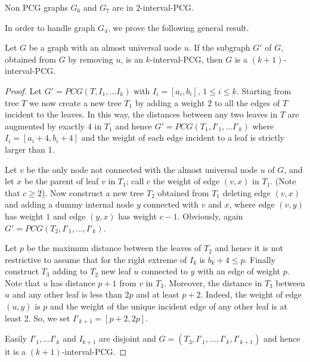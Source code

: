 \documentclass{fundam}
\newcommand{\Int}[1]{$#1$\textnormal{-interval-PCG}}
\begin{document}
\begin{corollary}
Non PCG graphs $G_6$ and $G_7$ are in \Int{2}.
\end{corollary}

In order to handle graph $G_4$, we prove the following general result.

\begin{theorem}
\label{theo:almost}
Let $G$ be a graph with an almost universal node $u$. If the subgraph $G'$ of $G$, obtained from $G$ by removing $u$, is  an \Int{k}, then $G$ is a \Int{(k+1)}.
\end{theorem}
\begin{proof}
Let $G'=PCG(T,I_1,\ldots I_k)$ with $I_i=[a_i, b_i]$, $1\leq i\leq k$.
Starting from tree $T$ we now create a new tree $T_1$ by adding a weight $2$
 to all the edges of $T$ incident to the leaves.
In this way, the distances between any two leaves in $T$ are augmented by exactly $4$ in $T_1$ and hence
$G'=PCG(T_1, I'_1,\ldots I'_k)$ where $I_i=[a_i+4,b_i+4]$ and the weight of each edge incident to a leaf is strictly larger than 1.

Let $v$ be the only node not connected with
the almost universal node $u$ of $G$, and let $x$ be the parent of leaf $v$ in $T_1$; call  $c$ the weight of edge $(v,x)$ in $T_1$. (Note that $c \geq 2$).
Now construct a new tree $T_2$ obtained from $T_1$ deleting edge $(v,x)$ and adding a  dummy internal node $y$ connected with $v$ and $x$, where edge $(v,y)$ has weight $1$ and edge $(y,x)$ has weight $c-1$. Obviously, again $G'=PCG(T_2,I'_1,\ldots,I'_k)$.


%
Let $p$ be the maximum distance between the leaves of $T_2$ and hence it is not restrictive to assume that for the right extreme of $I_k$ is $b_k+4 \leq p$.
Finally construct $T_3$ adding to $T_2$ new leaf $u$ connected to $y$ with an edge of weight $p$.
Note that $u$ has distance $p+1$ from $v$ in $T_3$.
Moreover, the distance in $T_3$ between $u$ and any other leaf is less than $2p$ and at least  $p+2$.
Indeed, the weight of edge $(u,y)$ is $p$ and the weight of the unique incident edge of any other leaf is at least 2.
So, we set $I'_{k+1}=[p+2,2p]$.

Easily $I'_1, \ldots I'_k$ and $I_{k+1}$ are disjoint and $G=(T_3,I'_1,\ldots,I'_k,I'_{k+1})$ and hence it is a \Int{(k+1)}.
\end{proof}
\end{document}
